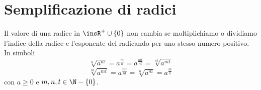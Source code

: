 \begin{comment}
In generale si dà la seguente
\begin{definizione}
Si dice \emph{potenza a esponente razionale} \(\frac m n\) di un numero reale 
positivo \(a\) l'espressione:
 \(a^{\frac m n}=\sqrt[n]{a^m}=\left(\sqrt[n]a\right)^m\) con 
 \(\frac m n\in \Q\).
\end{definizione}

Perché abbiamo dovuto imporre la condizione che~\(a\) sia un numero positivo?
Partiamo dall'espressione \(a^{\frac 1 n}\) con \(n\in \N-\{0\}\), 
se \(n\) è dispari la potenza \(a^{\frac 1 n}\) è sempre definita per ogni 
valore 
della base \(a\), mentre se è pari \(a^{\frac 1 n}\) è definita solo 
per \(a{\geq}0\).

Nel caso generale \(a^{\frac m n}\) con \(\frac m n\in \Q\) 
la formula \(a^{\frac m n}=\left(\sqrt[n]a\right)^m\) è falsa se \(a<0\).

Consideriamo il seguente esempio:
\((-2)^{\frac 6 6}=\left[(-2)^{\frac 1 
6}\right]^6=\left(\sqrt[6]{-2}\right)^6\) 
non è definita nei numeri reali perché non esiste la radice sesta di un 
numero 
negativo.
Tuttavia possiamo anche scrivere 

\[(-2)^{\frac 6 6}=\left[(-2)^6\right]^{\frac 1 6}=(64)^{\frac 1 6}=
\sqrt[6]{64}=2.\]

Arriviamo pertanto a due risultati differenti.

Per estendere la definizione al caso di basi negative sarebbe necessario 
stabilire un ordine di priorità delle operazioni ma ciò andrebbe contro la 
proprietà commutativa del prodotto degli esponenti di una potenza di 
potenza.

\ref{ese:2.18}, 

\end{comment}

\section{Semplificazione di radici}
\label{sec:radicali_semplificazione}

\begin{proposizione}
Il valore di una radice in \(\insR^+\cup \{0\}\) non cambia se moltiplichiamo 
o dividiamo l'indice della radice e l'esponente del radicando per uno 
stesso numero positivo. 
In simboli 
\[\sqrt[n]{a^m}=a^{\frac{m}{n}}=a^{\frac{mt}{nt}}=\sqrt[nt]{a^{mt}}\]
\[\sqrt[nt]{a^{mt}}=a^{\frac{mt}{nt}}=\sqrt[n]{a^m}=a^{\frac{m}{n}}\]
con \(a\ge 0\) e \(m,n,t\in \N-\{0\}\).
\end{proposizione}

